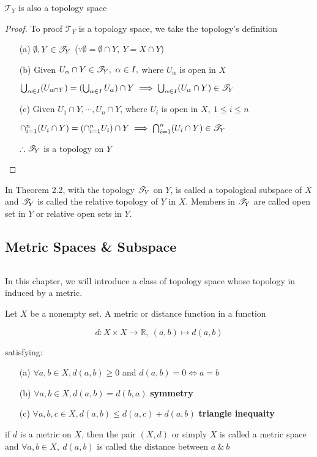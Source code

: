 \begin{thm}
	$\mathscr T_Y$ is also a topology space
\end{thm}

\begin{proof}
	To proof $\mathscr T_Y$ is a topology space, we take the topology's definition
	\begin{enumerate}
		\item[(a)] $\emptyset,Y \in \mathscr{T}_Y$ ($\because \emptyset = \emptyset \cap Y,~Y = X \cap Y$)
		\item[(b)] Given $U_{\alpha} \cap Y \in \mathscr{T}_Y,~\alpha \in I,$ where $U_{\alpha}$ is open in $X$
		
		$\bigcup_{\alpha \in I}(U_{\alpha \cap Y}) = (\bigcup_{\alpha \in I}U_{\alpha})\cap Y \implies \bigcup_{\alpha \in I}(U_{\alpha} \cap Y) \in \mathscr{T}_Y$
		\item[(c)] Given $U_1 \cap Y,\cdots,U_n \cap Y$, where $U_i$ is open in $X,~1 \leq i \leq n$
		
		$\cap^n_{i=1}(U_i \cap Y) = (\cap^n_{i=1}U_i) \cap Y \implies \bigcap^n_{i=1}(U_i \cap Y) \in \mathscr{T}_Y$
		
		$\therefore \mathscr{T}_Y$ is a topology on $Y$
	\end{enumerate}
\end{proof}

\begin{defn}
	In Theorem 2.2, with the topology $\mathscr{T}_Y$ on $Y$, is called a topological subspace of $X$ and $\mathscr{T}_Y$ is called the relative topology of $Y$ in $X$. Members in $\mathscr{T}_Y$ are called open set in $Y$ or relative open sets in $Y$.
\end{defn}

\newpage

\subsection{Metric Spaces \& Subspace}$ $

In this chapter, we will introduce a class of topology space whose topology in induced by a metric.
\begin{defn}
	Let $X$ be a nonempty set. A metric or distance function in a function
	
	$$d:X\times X \rightarrow \mathbb R,~(a,b) \mapsto d(a,b)$$
	
	satisfying:
	
	\begin{enumerate}
		\item[(a)] $\forall a,b \in X,d(a,b) \geq 0$ and $d(a,b) = 0 \Leftrightarrow a = b$
		\item[(b)] $\forall a,b \in X,d(a,b) = d(b,a)$ \textbf{symmetry}
		\item[(c)] $\forall a,b,c \in X,d(a,b) \leq d(a,c)+d(a,b)$ \textbf{triangle inequaity}
	\end{enumerate}
	
	if $d$ is a metric on $X$, then the pair $(X,d)$ or simply $X$ is called a metric space and $\forall a,b \in X,~d(a,b)$ is called the distance between $a ~\&~b$
\end{defn}


